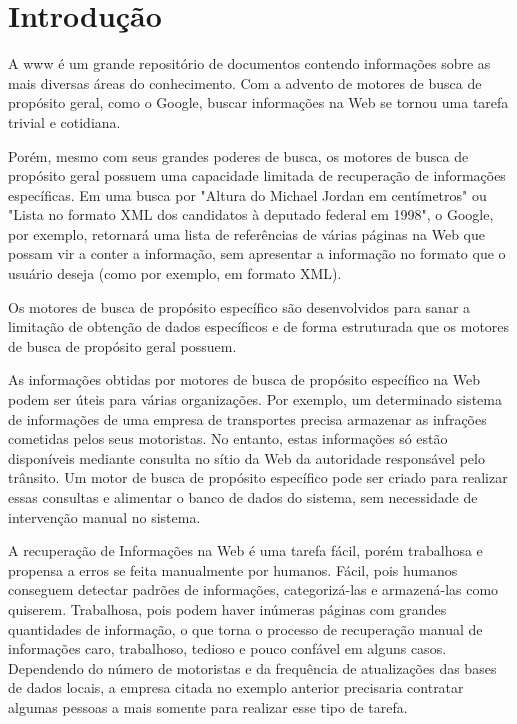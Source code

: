 \chapter{Introdução}
\thispagestyle{fancy}

A \gls{www} é um grande repositório de documentos contendo informações sobre as mais diversas áreas do conhecimento. Com a advento de motores de busca de propósito geral, como o Google, buscar informações na Web se tornou uma tarefa trivial e cotidiana.

Porém, mesmo com seus grandes poderes de busca, os motores de busca de propósito geral possuem uma capacidade limitada de recuperação de informações específicas. Em uma busca por "Altura do Michael Jordan em centímetros" ou "Lista no formato XML dos candidatos à deputado federal em 1998", o Google, por exemplo, retornará uma lista de referências de várias páginas na Web que possam vir a conter a informação, sem apresentar a informação no formato que o usuário deseja (como por exemplo, em formato XML).

Os motores de busca de propósito específico são desenvolvidos para sanar a limitação de obtenção de dados específicos e de forma estruturada que os motores de busca de propósito geral possuem.

As informações obtidas por motores de busca de propósito específico na Web podem ser úteis para várias organizações. Por exemplo, um determinado sistema de informações de uma empresa de transportes precisa armazenar as infrações cometidas pelos seus motoristas. No entanto, estas informações só estão disponíveis mediante consulta no sítio da Web da autoridade responsável pelo trânsito. Um motor de busca de propósito específico pode ser criado para realizar essas consultas e alimentar o banco de dados do sistema, sem necessidade de intervenção manual no sistema.


A recuperação de Informações na Web é uma tarefa fácil, porém trabalhosa e propensa a erros se feita manualmente por humanos. Fácil, pois humanos conseguem detectar padrões de informações, categorizá-las e armazená-las como quiserem. Trabalhosa, pois podem haver inúmeras páginas com grandes quantidades de informação, o que torna o processo de recuperação manual de informações caro, trabalhoso, tedioso e pouco confável em alguns casos. Dependendo do número de motoristas e da frequência de atualizações das bases de dados locais, a empresa citada no exemplo anterior precisaria contratar algumas pessoas a mais somente para realizar esse tipo de tarefa.

